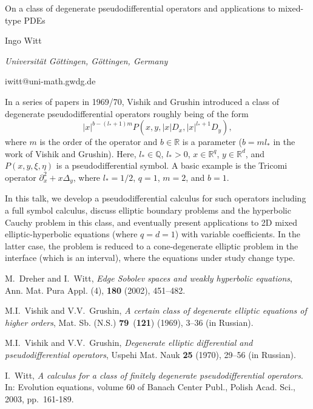 \documentclass[10pt,a4paper]{article}
\begin{document}
\begin{center}

{\Large On a class of degenerate pseudodifferential operators and applications to mixed-type PDEs}

\bigskip

{\sc Ingo Witt}

{\small\it Universit{\"a}t G{\"o}ttingen, G{\"o}ttingen, Germany}

{\small\rm iwitt@uni-math.gwdg.de}

\end{center}

\bigskip

In a series of papers in 1969/70, Vishik and Grushin \cite{VG69, VG70}
introduced a class of degenerate pseudodifferential operators roughly
being of the form
\[
|x|^{b-(l_\ast+1)m} P(x,y,|x|D_x,|x|^{l_\ast+1}D_y),
\]
where $m$ is the order of the operator and $b\in{\mathbb R}$ is a
parameter ($b=m l_\ast$ in the work of Vishik and Grushin). Here,
$l_\ast\in {\mathbb Q}$, $l_\ast>0$, $x\in{\mathbb R}^q$, $y\in
{\mathbb R}^d$, and $P(x,y,\xi,\eta)$ is a pseudodifferential
symbol. A basic example is the Tricomi operator $\partial_x^2 + x
\Delta_y$, where $l_\ast=1/2$, $q=1$, $m=2$, and $b=1$.

In this talk, we develop a pseudodifferential calculus for such
operators including a full symbol calculus, discuss elliptic boundary
problems \cite{W03} and the hyperbolic Cauchy problem \cite{DW02} in
this class, and eventually present applications to 2D mixed
elliptic-hyperbolic equations (where $q=d=1$) with variable
coefficients. In the latter case, the problem is reduced to a
cone-degenerate elliptic problem in the interface (which is an
interval), where the equations under study change type.

\begin{thebibliography}{9}

 M.~Dreher and I.~Witt, \emph{Edge {S}obolev spaces and
weakly hyperbolic equations}, Ann. Mat. Pura Appl. (4),
\textbf{180} (2002), 451--482.

 M.I.~Vishik and V.V.~Grushin, \emph{A certain class of
degenerate elliptic equations of higher orders}, Mat. Sb. (N.S.)
\textbf{79}~(\textbf{121}) (1969), 3--36 (in Russian).

 M.I.~Vishik and V.V.~Grushin, \emph{Degenerate elliptic
differential and pseudo\-differential operators}, Uspehi Mat. Nauk
\textbf{25} (1970), 29--56 (in Russian).

 I.~Witt, \emph{A calculus for a class of finitely
degenerate pseudodifferential operators}. In: Evolution equations,
volume 60 of Banach Center Publ., Polish Acad. Sci., 2003,
pp.~161-189.

\end{thebibliography}
\end{document}
